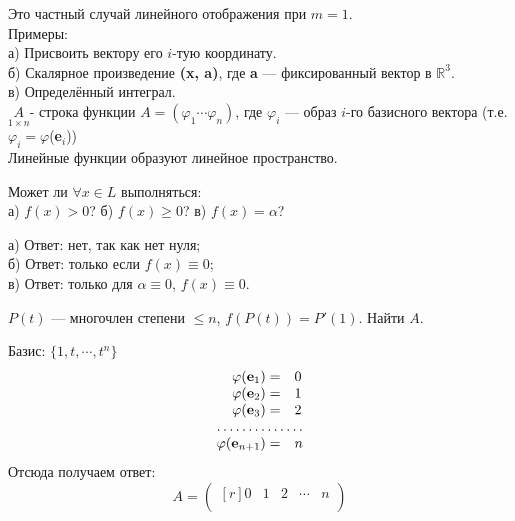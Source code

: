 Это частный случай линейного отображения при $m=1$.\\
Примеры:\\ %
а) Присвоить вектору его $i$-тую координату.\\
б) Скалярное произведение \textbf{(\textbf{x}, \textbf{a})}, где \textbf{a} --- фиксированный вектор в $\mathbb{R}^3$.\\
в) Определённый интеграл.\\

$\underset{1 \times n}A$- строка функции $A=(\varphi_1 \cdots \varphi_n)$, где $\varphi_i$ --- образ $i$-го базисного вектора (т.е. $\varphi_i=\varphi$(\textbf{e$_i$}))\\

Линейные функции образуют линейное пространство.

\begin{prim}
	Может ли $ \forall x \in L$ выполняться:\\
	а) $f(x)>0$? 
	б) $f(x)\geq 0$? 
	в) $f(x)=\alpha $? 
\end{prim}
а) Ответ: нет, так как нет нуля;\\
б) Ответ: только если $f(x)\equiv0$;\\
в) Ответ: только для $\alpha\equiv0$, $f(x)\equiv0$.\\
\begin{prim}
	$P(t)$ ---  многочлен степени $\leq n$, $f(P(t))=P'(1)$. Найти $A$.
\end{prim}
Базис: $\{ 1, t,\cdots, t^n\}$\\
$$
\begin{array}{rl}
\varphi (\text{\textbf{e$_1$}})=&0\\
\varphi (\text{\textbf{e$_2$}})=&1\\
\varphi (\text{\textbf{e$_3$}})=&2\\
\hdotsfor{2}\\
\varphi (\text{\textbf{e$_{n+1}$}})=&n\\
\end{array}
$$
Отсюда получаем ответ:
$$A=
\begin{pmatrix*}[r]
0 & 1 & 2 & \cdots & n\\
\end{pmatrix*}$$